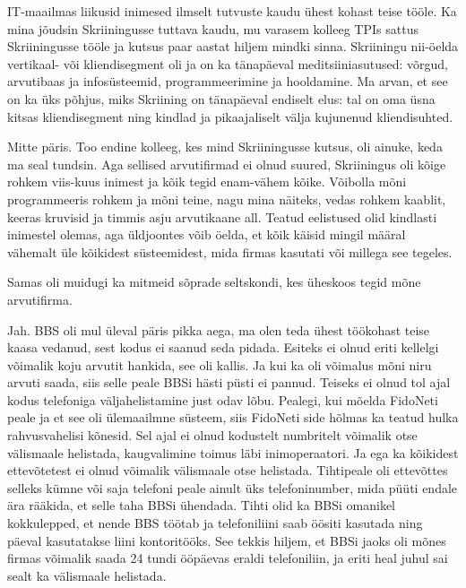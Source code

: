 IT-maailmas liikusid inimesed ilmselt tutvuste kaudu ühest kohast 
teise tööle. Ka mina jõudsin Skriiningusse tuttava 
kaudu, mu varasem kolleeg TPIs sattus 
Skriiningusse tööle ja kutsus paar aastat hiljem mindki sinna. 
Skriiningu nii-öelda vertikaal- või kliendisegment oli ja on ka tänapäeval 
meditsiiniasutused: võrgud, arvutibaas ja infosüsteemid, 
programmeerimine ja hooldamine. Ma arvan, et see on ka üks põhjus, miks 
Skriining on tänapäeval endiselt elus: tal on oma 
üsna kitsas kliendisegment ning kindlad ja pikaajaliselt välja kujunenud kliendisuhted.


Mitte päris. Too endine kolleeg, kes mind Skriiningusse
kutsus, oli ainuke, keda ma seal tundsin. Aga sellised arvutifirmad ei olnud suured, Skriiningus oli kõige rohkem viis-kuus 
inimest ja kõik tegid enam-vähem kõike. Võibolla 
mõni programmeeris rohkem ja mõni teine, nagu mina näiteks, vedas rohkem 
kaablit, keeras kruvisid ja timmis asju 
arvutikaane all. Teatud eelistused olid kindlasti inimestel olemas, aga 
üldjoontes võib öelda, et kõik käisid mingil määral vähemalt üle kõikidest süsteemidest, mida firmas kasutati või millega see tegeles.

Samas oli muidugi ka mitmeid sõprade seltskondi, kes üheskoos tegid mõne arvutifirma.


Jah. BBS oli mul üleval päris pikka aega, ma olen teda ühest töökohast teise kaasa vedanud, sest kodus ei saanud seda pidada. 
Esiteks ei olnud eriti kellelgi võimalik koju arvutit hankida, see oli kallis. 
Ja kui ka oli võimalus mõni niru arvuti saada, siis selle peale 
BBSi hästi püsti ei pannud. Teiseks ei olnud tol ajal kodus telefoniga 
väljahelistamine just odav lõbu. Pealegi, kui mõelda 
FidoNeti peale ja et see oli ülemaailmne süsteem, siis FidoNeti side 
hõlmas ka teatud hulka rahvusvahelisi kõnesid. Sel ajal ei olnud kodustelt numbritelt 
võimalik otse välismaale helistada, kaugvalimine toimus läbi 
inimoperaatori. Ja ega ka kõikidest ettevõtetest ei olnud võimalik välismaale 
otse helistada. Tihtipeale oli ettevõttes selleks kümne 
või saja telefoni peale ainult üks telefoninumber, mida püüti 
endale ära rääkida, et selle taha BBSi ühendada. Tihti olid ka 
BBSi omanikel kokkulepped, et nende BBS töötab ja telefoniliini saab öösiti kasutada 
ning päeval kasutatakse liini kontoritööks. 
See tekkis hiljem, et BBSi jaoks oli mõnes firmas võimalik 
saada 24 tundi ööpäevas eraldi telefoniliin, ja eriti heal juhul sai sealt ka 
välismaale helistada.


